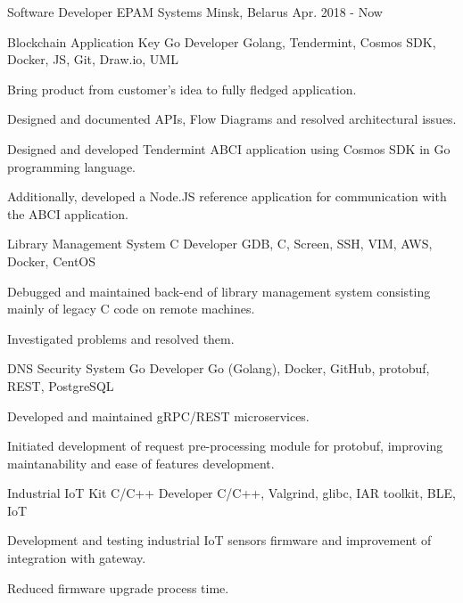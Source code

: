 

\begin{cventries}
\cventry
    {Software Developer} %
    {EPAM Systems} %
    {Minsk, Belarus} %
    {Apr. 2018 - Now} %
    {%
        \cvproject
            {Blockchain Application} %
            {Key Go Developer} %
            {Golang, Tendermint, Cosmos SDK, Docker, JS, Git, Draw.io, UML}%
            {
            \begin{cvitems}
                \item { Bring product from customer's idea to fully fledged application. }
                \item { Designed and documented APIs, Flow Diagrams and resolved architectural issues. }
                \item { Designed and developed Tendermint ABCI application using Cosmos SDK in Go programming language. }
                \item { Additionally, developed a Node.JS reference application for communication with the ABCI application.}
            \end{cvitems}    
           }
        \cvproject
            {Library Management System} %
            {C Developer} %
            {GDB, C, Screen, SSH, VIM, AWS, Docker, CentOS}%
            {
                \begin{cvitems}
                    \item {Debugged and maintained back-end of library management
                    system consisting mainly of legacy C code on remote machines. }
                    \item { Investigated problems and resolved them.}
                \end{cvitems}    
           }
        \cvproject
            {DNS Security System} %
            {Go Developer} %
            {Go (Golang), Docker, GitHub, protobuf, REST, PostgreSQL}%
            {
                \begin{cvitems}
                    \item {Developed and maintained gRPC/REST microservices.}
                    \item {Initiated development of request pre-processing module for protobuf, improving maintanability and 
                    ease of features development.}
                \end{cvitems}  
            }
        \cvproject
            {Industrial IoT Kit} %
            {C/C++ Developer} %
            {C/C++, Valgrind, glibc, IAR toolkit, BLE, IoT}%
            {
                \begin{cvitems}
                    \item {Development and testing industrial IoT sensors firmware and
                        improvement of integration with gateway.}
                    \item {Reduced firmware upgrade process time.}
                \end{cvitems} 
            }
    }


\end{cventries}
